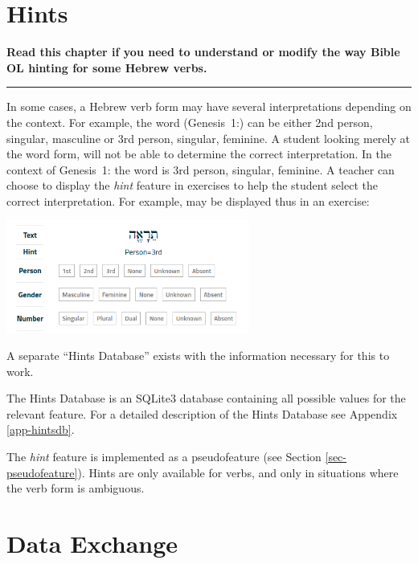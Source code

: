 \documentclass[11pt,oneside,a4paper]{memoir}
\newcommand*{\bibleref}[3]{#1~#2\thinspace:\thinspace#3}
\newcommand{\heb}[1]{{\RL {\ezr #1}}}
\begin{document}
\chapter{Hints}\label{chap-hints}

\textbf{Read this chapter if you need to understand or modify the way Bible OL hinting for some
  Hebrew verbs.}
\plainbreak{3}


In some cases, a Hebrew verb form may have several interpretations depending on the context. For
example, the word \heb{תֵרָאֶה} (\bibleref{Genesis}{1}{9}) can be either 2nd person, singular,
masculine or 3rd person, singular, feminine. A student looking merely at the word form, will not be
able to determine the correct interpretation. In the context of \bibleref{Genesis}{1}{9} the word is
3rd person, singular, feminine. A teacher can choose to display the \emph{hint} feature in exercises
to help the student select the correct interpretation. For example, \heb{תֵרָאֶה} may be
displayed thus in an exercise:

\begin{center}
  \includegraphics[width=0.6\textwidth]{hint.png}
\end{center}

A separate ``Hints Database'' exists with the information necessary
for this to work.

The Hints Database is an SQLite3 database containing all possible values for the
relevant feature. For a detailed description of the Hints Database see Appendix \ref{app-hintsdb}.

The \emph{hint} feature is implemented as a pseudofeature (see Section \ref{sec-pseudofeature}).
Hints are only available for verbs, and only in situations where the verb form is ambiguous.


\chapter{Data Exchange}\label{chap-data-exchange}
\end{document}
